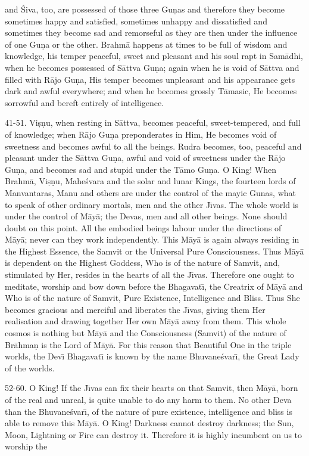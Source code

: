 and \'Siva, too, are possessed of those three Gu\d{n}as and therefore they become sometimes happy and satisfied, sometimes unhappy and dissatisfied and sometimes they become sad and remorseful as they are then under the influence of one Gu\d{n}a or the other. Brahm\=a happens at times to be full of wisdom and knowledge, his temper peaceful, sweet and pleasant and his soul rapt in Sam\=adhi, when he becomes possessed of S\=attva Gu\d{n}a; again when he is void of S\=attva and filled with R\=ajo Gu\d{n}a, His temper becomes unpleasant and his appearance gets dark and awful everywhere; and when he becomes grossly T\=amasic, He becomes sorrowful and bereft entirely of intelligence.

41-51. Vi\d{s}\d{n}u, when resting in S\=attva, becomes peaceful, sweet-tempered, and full of knowledge; when R\=ajo Gu\d{n}a preponderates in Him, He becomes void of sweetness and becomes awful to all the beings. Rudra becomes, too, peaceful and pleasant under the S\=attva Gu\d{n}a, awful and void of sweetness under the R\=ajo Gu\d{n}a, and becomes sad and stupid under the T\=amo Gu\d{n}a. O King! When Brahm\=a, Vi\d{s}\d{n}u, Mahe\'svara and the solar and lunar Kings, the fourteen lords of Manvantaras, Manu and others are under the control of the mayic Gunas, what to speak of other ordinary mortals, men and the other J\={\i}vas. The whole world is under the control of M\=ay\=a; the Devas, men and all other beings. None should doubt on this point. All the embodied beings labour under the directions of M\=ay\=a; never can they work independently. This M\=ay\=a is again always residing in the Highest Essence, the Samvit or the Universal Pure Consciousness. Thus M\=ay\=a is dependent on the Highest Goddess, Who is of the nature of Samvit, and, stimulated by Her, resides in the hearts of all the J\={\i}vas. Therefore one ought to meditate, worship and bow down before the Bhagavat\={\i}, the Creatrix of M\=ay\=a and Who is of the nature of Samvit, Pure Existence, Intelligence and Bliss. Thus She becomes gracious and merciful and liberates the J\={\i}vas, giving them Her realisation and drawing together Her own M\=ay\=a away from them. This whole cosmos is nothing but M\=ay\=a and the Consciousness (Samvit) of the nature of Br\=ahma\d{n} is the Lord of M\=ay\=a. For this reason that Beautiful One in the triple worlds, the Dev\={\i} Bhagavat\={\i} is known by the name Bhuvane\'svar\={\i}, the Great Lady of the worlds.

52-60. O King! If the J\={\i}vas can fix their hearts on that Samvit, then M\=ay\=a, born of the real and unreal, is quite unable to do any harm to them. No other Deva than the Bhuvane\'svar\={\i}, of the nature of pure existence, intelligence and bliss is able to remove this M\=ay\=a. O King! Darkness cannot destroy darkness; the Sun, Moon, Lightning or Fire can destroy it. Therefore it is highly incumbent on us to worship the

